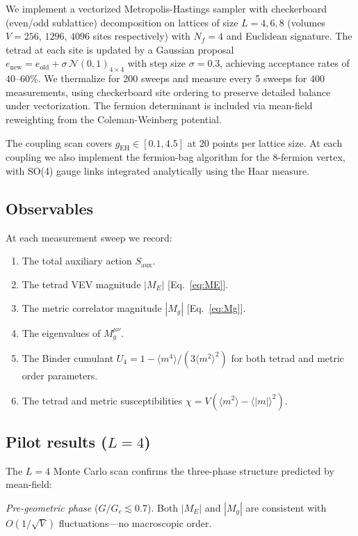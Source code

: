\documentclass[aps,prd,twocolumn,superscriptaddress,nofootinbib]{revtex4-2}
\newcommand{\Gc}{G_c}
\newcommand{\Nf}{N_f}
\begin{document}
We implement a vectorized Metropolis-Hastings sampler with checkerboard
(even/odd sublattice) decomposition on lattices of size $L=4,6,8$
(volumes $V = 256$, $1296$, $4096$ sites respectively) with $\Nf = 4$
and Euclidean signature. The tetrad at each site is updated by a Gaussian
proposal
$e_{\mathrm{new}} = e_{\mathrm{old}} + \sigma\,\mathcal{N}(0,1)_{4\times 4}$
with step size $\sigma = 0.3$, achieving acceptance rates of $40$--$60\%$.
We thermalize for 200 sweeps and measure every 5 sweeps for 400
measurements, using checkerboard site ordering to preserve detailed
balance under vectorization. The fermion determinant is included via
mean-field reweighting from the Coleman-Weinberg potential.

The coupling scan covers $g_{\mathrm{EH}} \in [0.1, 4.5]$ at 20 points
per lattice size. At each coupling we also implement the fermion-bag
algorithm for the 8-fermion vertex, with SO(4) gauge links integrated
analytically using the Haar measure.

\subsection{Observables}

At each measurement sweep we record:
\begin{enumerate}
\item The total auxiliary action $S_{\mathrm{aux}}$.
\item The tetrad VEV magnitude $|M_E|$ [Eq.~\eqref{eq:ME}].
\item The metric correlator magnitude $|M_g|$ [Eq.~\eqref{eq:Mg}].
\item The eigenvalues of $M_g^{\mu\nu}$.
\item The Binder cumulant $U_4 = 1 - \langle m^4\rangle/(3\langle m^2\rangle^2)$
  for both tetrad and metric order parameters.
\item The tetrad and metric susceptibilities $\chi = V(\langle m^2\rangle - \langle |m|\rangle^2)$.
\end{enumerate}

\subsection{Pilot results ($L=4$)}

The $L=4$ Monte Carlo scan confirms the three-phase structure predicted
by mean-field:

\textit{Pre-geometric phase} ($G/\Gc \lesssim 0.7$). Both $|M_E|$ and
$|M_g|$ are consistent with $O(1/\sqrt{V})$ fluctuations---no
macroscopic order.
\end{document}
